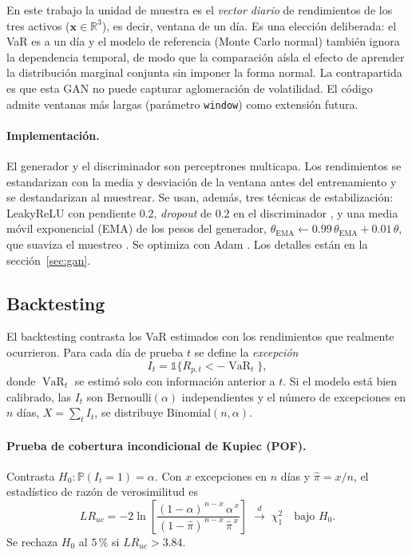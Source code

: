 \documentclass[12pt,letterpaper]{article}
\newcommand{\R}{\mathbb{R}}
\newcommand{\Prob}{\mathbb{P}}
\newcommand{\VaR}{\operatorname{VaR}}
\newcommand{\ind}{\mathbb{1}}
\begin{document}
En este trabajo la unidad de muestra es el \emph{vector diario} de rendimientos de los tres activos ($\mathbf x\in\R^3$), es decir, ventana de un día. Es una elección deliberada: el VaR es a un día y el modelo de referencia (Monte Carlo normal) también ignora la dependencia temporal, de modo que la comparación aísla el efecto de aprender la distribución marginal conjunta sin imponer la forma normal. La contrapartida es que esta GAN no puede capturar aglomeración de volatilidad. El código admite ventanas más largas (parámetro \texttt{window}) como extensión futura.

\paragraph{Implementación.}
El generador y el discriminador son perceptrones multicapa. Los rendimientos se estandarizan con la media y desviación de la ventana antes del entrenamiento y se destandarizan al muestrear. Se usan, además, tres técnicas de estabilización: LeakyReLU con pendiente $0.2$, \emph{dropout} de $0.2$ en el discriminador \cite{srivastava2014}, y una media móvil exponencial (EMA) de los pesos del generador, $\theta_{\text{EMA}}\leftarrow 0.99\,\theta_{\text{EMA}}+0.01\,\theta$, que suaviza el muestreo \cite{yazici2019}. Se optimiza con Adam \cite{kingma2015}. Los detalles están en la sección~\ref{sec:gan}.

\subsection{Backtesting}\label{sec:teoria-backtest}

El backtesting contrasta los VaR estimados con los rendimientos que realmente ocurrieron. Para cada día de prueba $t$ se define la \emph{excepción}
\begin{equation}
  I_t=\ind\{R_{p,t}<-\VaR_t\},
\end{equation}
donde $\VaR_t$ se estimó solo con información anterior a $t$. Si el modelo está bien calibrado, las $I_t$ son Bernoulli$(\alpha)$ independientes y el número de excepciones en $n$ días, $X=\sum_t I_t$, se distribuye $\mathrm{Binomial}(n,\alpha)$.

\paragraph{Prueba de cobertura incondicional de Kupiec (POF).}
Contrasta $H_0:\Prob(I_t=1)=\alpha$. Con $x$ excepciones en $n$ días y $\hat\pi=x/n$, el estadístico de razón de verosimilitud es \cite{kupiec1995}
\begin{equation}\label{eq:kupiec}
  LR_{uc}=-2\ln\!\left[\frac{(1-\alpha)^{\,n-x}\,\alpha^{\,x}}{(1-\hat\pi)^{\,n-x}\,\hat\pi^{\,x}}\right]\;\xrightarrow{d}\;\chi^2_1 \quad\text{bajo } H_0 .
\end{equation}
Se rechaza $H_0$ al $5\,\%$ si $LR_{uc}>3.84$.
\end{document}
